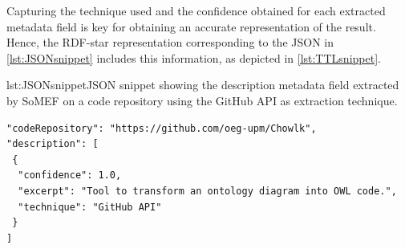 Capturing the technique used and the confidence obtained for each extracted metadata field is key for obtaining an accurate representation of the result. Hence, the \mbox{RDF-star} representation corresponding to the JSON in \cref{lst:JSONsnippet} includes this information, as depicted in \cref{lst:TTLsnippet}.
 
\noindent\hspace{0.07\linewidth}\begin{minipage}{0.9\linewidth}
\begin{captionedlisting}{lst:JSONsnippet}{JSON snippet showing the description metadata field extracted by SoMEF on a code repository using the GitHub API as extraction technique.}
\centering
\hspace{3em}
{
\begin{lstlisting}[basicstyle=\ttfamily\small,label={list:example1},columns=flexible]
"codeRepository": "https://github.com/oeg-upm/Chowlk",
"description": [ 
 {
  "confidence": 1.0,
  "excerpt": "Tool to transform an ontology diagram into OWL code.",
  "technique": "GitHub API"
 }
]  
\end{lstlisting}
}
\end{captionedlisting}
\end{minipage}



